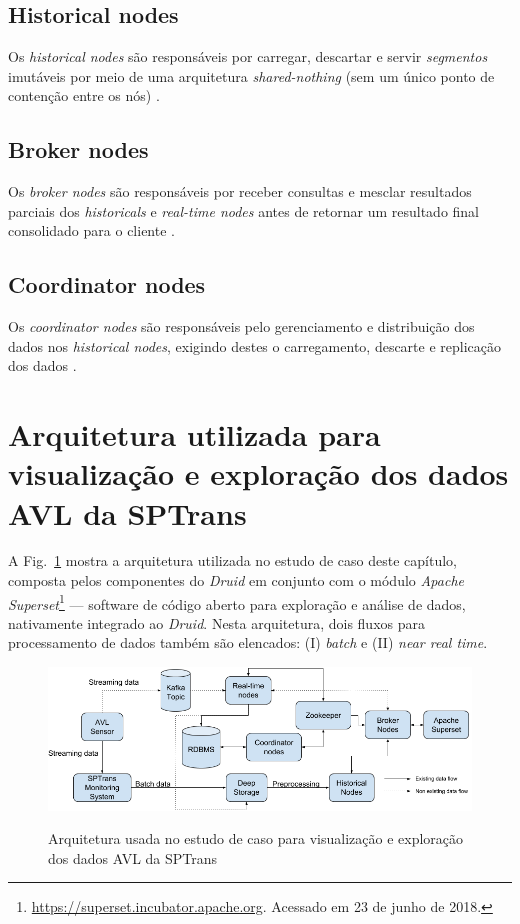 \documentclass[
	12pt,				%
	oneside,			%
	a4paper,			%
	english,			%
	brazil				%
	]{abntex2ppgsi}
\begin{document}
{{\subsection{Historical nodes}

Os \textit{historical nodes} são responsáveis por carregar, descartar e servir \emph{segmentos} imutáveis por meio de uma arquitetura \textit{shared-nothing} (sem um único ponto de contenção entre os nós) \cite{yang2014druid}.

\subsection{Broker nodes}

Os \textit{broker nodes} são responsáveis por receber consultas e mesclar resultados parciais dos \textit{historicals} e \textit{real-time nodes} antes de retornar um resultado final consolidado para o cliente \cite{yang2014druid}.

\subsection{Coordinator nodes}

Os \textit{coordinator nodes} são responsáveis pelo gerenciamento e distribuição dos dados nos \textit {historical nodes}, exigindo destes o carregamento, descarte e replicação dos dados \cite{yang2014druid}.

\section{Arquitetura utilizada para visualização e exploração dos dados AVL da SPTrans}
\label{arch_viz}

A Fig.~\ref{fig:viz_arch} mostra a arquitetura utilizada no estudo de caso deste capítulo, composta pelos componentes do \textit{Druid} em conjunto com o módulo \textit {Apache Superset}\footnote{\url{https://superset.incubator.apache.org}. Acessado em 23 de junho de 2018.} --- software de código aberto para exploração e análise de dados, nativamente integrado ao \textit{Druid}. Nesta arquitetura, dois fluxos para processamento de dados também são elencados: (I) \textit{batch} e (II) \textit{near real time}.

\begin{figure}[!htb]%
	\centering
 	  \caption{Arquitetura usada no estudo de caso para visualização e exploração dos dados AVL da SPTrans}
		\includegraphics[width=1\linewidth]{images/viz_arch.png}
	\label{fig:viz_arch}
\end{figure}

}}
\end{document}

